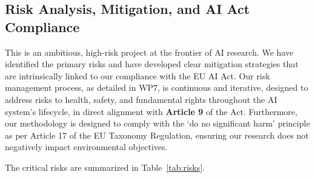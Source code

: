 \documentclass[11pt, a4paper]{article}
\begin{document}
\subsection{Risk Analysis, Mitigation, and AI Act Compliance}
This is an ambitious, high-risk project at the frontier of AI research. We have identified the primary risks and have developed clear mitigation strategies that are intrinsically linked to our compliance with the EU AI Act. Our risk management process, as detailed in WP7, is continuous and iterative, designed to address risks to health, safety, and fundamental rights throughout the AI system's lifecycle, in direct alignment with \textbf{Article 9} of the Act. Furthermore, our methodology is designed to comply with the ‘do no significant harm’ principle as per Article 17 of the EU Taxonomy Regulation, ensuring our research does not negatively impact environmental objectives.

The critical risks are summarized in Table~\ref{tab:risks}.
\end{document}
